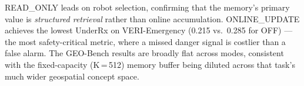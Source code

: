\documentclass[runningheads]{llncs}
\begin{document}
\begin{table}[ht]
\centering
\caption{Memory mode ablation across all tasks. Robot Sel.: 250 samples; VERI: 200; GEO: 3,001.}
\label{tab:mem-ablation}
\setlength{\tabcolsep}{4pt}

\end{table}

READ\_ONLY leads on robot selection, confirming that the memory's primary value is \emph{structured retrieval} rather than online accumulation. ONLINE\_UPDATE achieves the lowest UnderRx on VERI-Emergency (0.215 vs.\ 0.285 for OFF) — the most safety-critical metric, where a missed danger signal is costlier than a false alarm. The GEO-Bench results are broadly flat across modes, consistent with the fixed-capacity (K\,=\,512) memory buffer being diluted across that task's much wider geospatial concept space.
\end{document}
